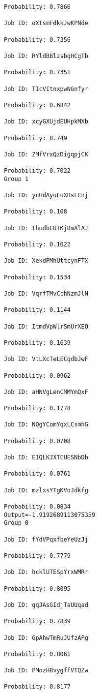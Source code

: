 \documentclass[11pt]{article}
\begin{document}
\begin{Verbatim}[commandchars=\\\{\}]
Probability: 0.7866

Job ID: oXtsmFdkkJwKPNde

Probability: 0.7356

Job ID: RYldBBlzsbqHCgTb

Probability: 0.7351

Job ID: TIcVItnxpwNGnfyr

Probability: 0.6842

Job ID: xcyGXUjdEUHpkMXb

Probability: 0.749

Job ID: ZMfVrxQzDigqpjCK

Probability: 0.7022
Group 1

Job ID: ycHdAyuFuXBsLCnj

Probability: 0.108

Job ID: thudbCUTKjDmAlAJ

Probability: 0.1022

Job ID: XekdPMhUttcynFTX

Probability: 0.1534

Job ID: VqrfTMvCchNzmJlN

Probability: 0.1144

Job ID: ItmdVpWlrSmUrXEO

Probability: 0.1639

Job ID: VtLXcTeLECqdbJwF

Probability: 0.0962

Job ID: aHNVgLenCMMYmQxF

Probability: 0.1778

Job ID: NQgYComYqxLCsmhG

Probability: 0.0708

Job ID: EIQLKJXTCUESNbDb

Probability: 0.0761

Job ID: mzlxsYTgKVoJdkfg

Probability: 0.0834
Output=-1.9192689113075359
Group 0

Job ID: fYdVPqxfbeYeUzJj

Probability: 0.7779

Job ID: hcklUTESpYrxWMRr

Probability: 0.8095

Job ID: gqJAsGIdjTaUUqad

Probability: 0.7839

Job ID: GpAhwTmRuJUfzAPg

Probability: 0.8061

Job ID: PMozHBvygffVTQZw

Probability: 0.8177


\end{Verbatim}
\end{document}
